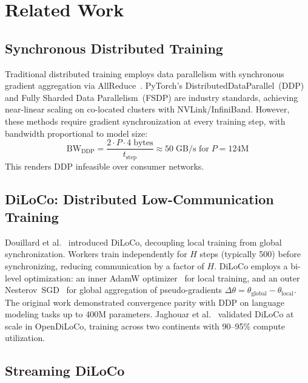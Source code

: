 \documentclass[10pt,conference]{IEEEtran}
\begin{document}
\section{Related Work}
\label{sec:related}

\subsection{Synchronous Distributed Training}

Traditional distributed training employs data parallelism with synchronous
gradient aggregation via AllReduce~\cite{li2020pytorch}. PyTorch's
DistributedDataParallel~(DDP) and Fully Sharded Data Parallelism~(FSDP) are
industry standards, achieving near-linear scaling on co-located clusters with
NVLink/InfiniBand. However, these methods require gradient synchronization at
every training step, with bandwidth proportional to model size:
\begin{equation}
  \text{BW}_{\text{DDP}} = \frac{2 \cdot P \cdot 4\;\text{bytes}}{t_{\text{step}}}
  \approx 50\;\text{GB/s for}\;P{=}124\text{M}
\end{equation}
This renders DDP infeasible over consumer networks.

\subsection{DiLoCo: Distributed Low-Communication Training}

Douillard et al.~\cite{douillard2023diloco} introduced DiLoCo, decoupling
local training from global synchronization. Workers train independently for
$H$ steps (typically 500) before synchronizing, reducing communication by a
factor of $H$. DiLoCo employs a bi-level optimization: an inner AdamW
optimizer~\cite{loshchilov2019adamw} for local training, and an outer
Nesterov~SGD~\cite{nesterov1983} for global aggregation of pseudo-gradients
$\Delta\theta = \theta_{\text{global}} - \theta_{\text{local}}$. The original
work demonstrated convergence parity with DDP on language modeling tasks up to
400M parameters. Jaghouar et al.~\cite{jaghouar2024opendiloco} validated
DiLoCo at scale in OpenDiLoCo, training across two continents with
90--95\% compute utilization.

\subsection{Streaming DiLoCo}
\end{document}
